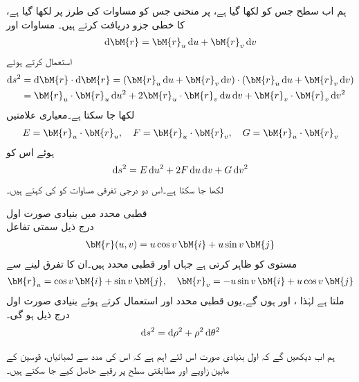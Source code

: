 ہم اب سطح  جس کو  لکھا گیا ہے، پر منحنی  جس کو مساوات  کی طرز پر لکھا گیا ہے،  کا خطی جزو دریافت کرتے ہیں۔ مساوات  اور
\begin{align*}
\dif \bM{r}=\bM{r}_u\dif u+\bM{r}_v\dif v
\end{align*}
استعمال کرتے ہوئے
\begin{align*}
\dif s^2&=\dif \bM{r}\cdot \dif \bM{r}=(\bM{r}_u\dif u+\bM{r}_v\dif v)\cdot (\bM{r}_u\dif u+\bM{r}_v\dif v)\\
&=\bM{r}_u\cdot \bM{r}_u \dif u^2+2\bM{r}_u\cdot \bM{r}_v\dif u\dif v+\bM{r}_v\cdot \bM{r}_v\dif v^2
\end{align*}
لکھا جا سکتا ہے۔معیاری علامتیں
\begin{align}\label{مساوات_خطی_تکمل_پہلی_بنیادی_صورت_الف}
E=\bM{r}_u\cdot \bM{r}_u,\quad F=\bM{r}_u\cdot \bM{r}_v,\quad G=\bM{r}_u\cdot \bM{r}_v
\end{align}
ہوئے اس کو 
\begin{align}\label{مساوات_خطی_تکمل_پہلی_بنیادی_صورت_ب}
\dif s^2=E\dif u^2+2F\dif u\dif v+G\dif v^2
\end{align}
لکھا جا سکتا ہے۔اس دو درجی تفرقی مساوات کو  کی  کہتے ہیں۔

\quad قطبی محدد میں بنیادی صورت اول\\
درج ذیل سمتی تفاعل
\begin{align*}
\bM{r}(u,v)=u\cos v\,\bM{i}+u\sin v\,\bM{j}
\end{align*}
 مستوی کو ظاہر کرتی ہے جہاں  اور  قطبی محدد ہیں۔ان کا تفرق لینے سے 
\begin{align*}
\bM{r}_u=\cos v\,\bM{i}+\sin v\,\bM{j},\quad \bM{r}_v=-u\sin v\,\bM{i}+u\cos v \,\bM{j}
\end{align*}
ملتا ہے لہٰذا ،  اور ہوں گے۔یوں قطبی محدد  اور  استعمال کرتے ہوئے بنیادی صورت اول درج ذیل ہو گی۔
\begin{align}\label{مساوات_خطی_تکمل_پہلی_بنیادی_صورت_پ}
\dif s^2=\dif \rho^2+\rho^2\dif \theta^2
\end{align}

ہم اب دیکھیں گے کہ اول بنیادی صورت اس لئے اہم ہے کہ اس کی مدد سے لمبائیاں، قوسین کے مابین زاویے اور مطابقتی سطح  پر رقبے حاصل کیے جا سکتے ہیں۔

